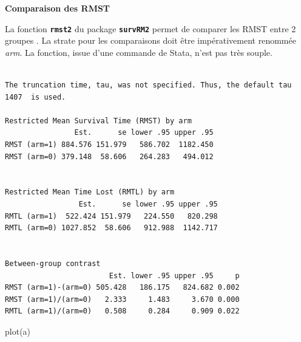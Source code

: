 \documentclass[
  12pt,
  letterpaper,
  DIV=11,
  numbers=noendperiod,
  onepage,
  openany]{scrreprt}
\newenvironment{Shaded}{\begin{snugshade}}{\end{snugshade}}
\newcommand{\AttributeTok}[1]{\textcolor[rgb]{0.80,0.80,0.80}{#1}}
\newcommand{\ConstantTok}[1]{\textcolor[rgb]{0.86,0.64,0.64}{\textbf{#1}}}
\newcommand{\FunctionTok}[1]{\textcolor[rgb]{0.94,0.94,0.56}{#1}}
\newcommand{\NormalTok}[1]{\textcolor[rgb]{0.80,0.80,0.80}{#1}}
\newcommand{\OtherTok}[1]{\textcolor[rgb]{0.94,0.94,0.56}{#1}}
\newcommand{\SpecialCharTok}[1]{\textcolor[rgb]{0.86,0.64,0.64}{#1}}
\begin{document}
\textbf{Comparaison des RMST}

La fonction \textbf{\texttt{rmst2}} du package \textbf{\texttt{survRM2}}
permet de comparer les RMST entre 2 groupes . La strate pour les
comparaisons doit être impérativement renommée \emph{arm}. La fonction,
issue d'une commande de Stata, n'est pas très souple.

\begin{Shaded}
\end{Shaded}

\begin{verbatim}

The truncation time, tau, was not specified. Thus, the default tau  1407  is used. 

Restricted Mean Survival Time (RMST) by arm 
                Est.      se lower .95 upper .95
RMST (arm=1) 884.576 151.979   586.702  1182.450
RMST (arm=0) 379.148  58.606   264.283   494.012


Restricted Mean Time Lost (RMTL) by arm 
                 Est.      se lower .95 upper .95
RMTL (arm=1)  522.424 151.979   224.550   820.298
RMTL (arm=0) 1027.852  58.606   912.988  1142.717


Between-group contrast 
                        Est. lower .95 upper .95     p
RMST (arm=1)-(arm=0) 505.428   186.175   824.682 0.002
RMST (arm=1)/(arm=0)   2.333     1.483     3.670 0.000
RMTL (arm=1)/(arm=0)   0.508     0.284     0.909 0.022
\end{verbatim}

\begin{Shaded}
\begin{Highlighting}[]
\FunctionTok{plot}\NormalTok{(a)}
\end{Highlighting}
\end{Shaded}
\end{document}
